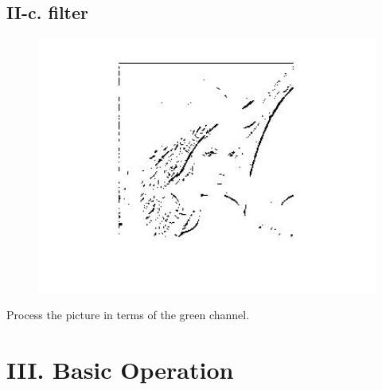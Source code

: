 \documentclass[twoside,a4paper]{article}
\begin{document}
\subsection*{II-c. filter}
\begin{figure}[H]
\centering
\includegraphics[width=6in]{filter.jpg}
\end{figure}
Process the picture in terms of the green channel.
\section*{III. Basic Operation}
\end{document}
